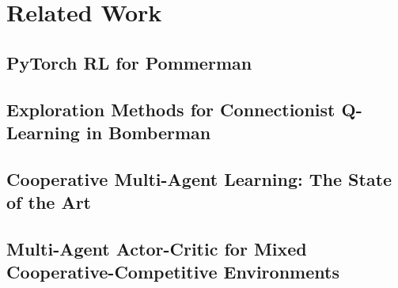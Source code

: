 \section{Related Work}



\subsection{PyTorch RL for Pommerman}

\subsection{Exploration Methods for Connectionist Q-Learning in Bomberman}

\subsection{Cooperative Multi-Agent Learning: The State of the Art}

\subsection{Multi-Agent Actor-Critic for Mixed Cooperative-Competitive Environments}